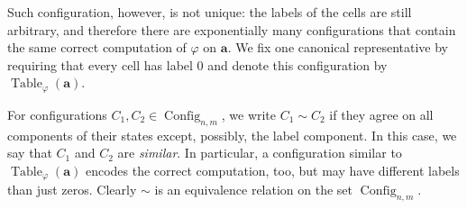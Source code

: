 \documentclass{article}
\theoremstyle{plain}
\theoremstyle{definition}
\DeclareMathOperator{\Config}{Config}
\DeclareMathOperator{\Table}{Table}
\newcommand{\tuple}{\mathbf}
\begin{document}
Such configuration, however, is not unique: the labels of the cells are still arbitrary,
and therefore there are exponentially many configurations that contain the same correct
computation of $\varphi$ on $\tuple a$. We fix one canonical representative by requiring that every cell has label $0$ 
and denote this configuration by $\Table_\varphi(\tuple a)$.

For configurations $C_1, C_2 \in \Config_{n,m}$, we write $C_1 \sim C_2$ if they agree on all components of their states except, possibly, the label component. In this case, we say
that $C_1$ and $C_2$ are \emph{similar}. In particular, a configuration similar to $\Table_\varphi(\tuple a)$ encodes the correct computation, too, but may have different labels than just zeros. Clearly $\sim$ is an equivalence relation on the set $\Config_{n,m}$.
\end{document}
